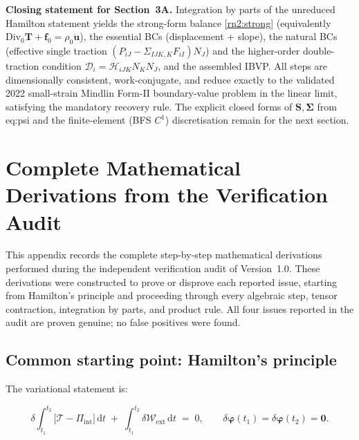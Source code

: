 \documentclass[11pt]{article}
\begin{document}
\noindent\textbf{Closing statement for Section~3A.} Integration by parts of the unreduced Hamilton statement yields the strong-form balance \eqref{rn2:strong} (equivalently $\mathrm{Div}_0\mathbf{T}+\mathbf{f}_0=\rho_0\ddot{\mathbf{u}}$), the essential BCs (displacement + slope), the natural BCs (effective single traction $(P_{iJ}-\Sigma_{IJK,K}F_{iI})N_J$) and the higher-order double-traction condition $\mathcal{D}_i=\mathcal{H}_{iJK}N_KN_J$, and the assembled IBVP. All steps are dimensionally consistent, work-conjugate, and reduce exactly to the validated 2022 small-strain Mindlin Form-II boundary-value problem in the linear limit, satisfying the mandatory recovery rule. The explicit closed forms of $\mathbf{S},\boldsymbol{\Sigma}$ from eq:psi and the finite-element (BFS $C^1$) discretisation remain for the next section.

\appendix

\section{Complete Mathematical Derivations from the Verification Audit}
\label{app:proofs}

This appendix records the complete step-by-step mathematical derivations performed during the independent verification audit of Version~1.0. These derivations were constructed to prove or disprove each reported issue, starting from Hamilton's principle and proceeding through every algebraic step, tensor contraction, integration by parts, and product rule. All four issues reported in the audit are proven genuine; no false positives were found.

\subsection{Common starting point: Hamilton's principle}

The variational statement is:

\begin{equation}
\delta\int_{t_1}^{t_2}\bigl[\mathcal{T}-\Pi_{\mathrm{int}}\bigr]\,\mathrm{d}t
\;+\;\int_{t_1}^{t_2}\delta\mathcal{W}_{\mathrm{ext}}\,\mathrm{d}t
\;=\;0,
\qquad
\delta\boldsymbol{\varphi}(t_1)=\delta\boldsymbol{\varphi}(t_2)=\mathbf{0}.
\label{app:hamilton}
\end{equation}
\end{document}
